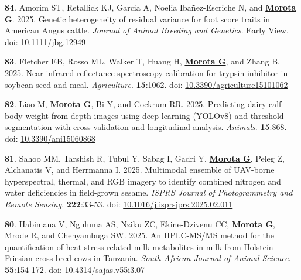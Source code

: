 \documentclass[margin,line,10pt]{res}
\newenvironment{list1}{
  \begin{list}{\ding{113}}{%
      \setlength{\itemsep}{0in}
      \setlength{\parsep}{0in} \setlength{\parskip}{0in}
      \setlength{\topsep}{0in} \setlength{\partopsep}{0in} 
      \setlength{\leftmargin}{0.17in}}}{\end{list}}
\begin{document}
\begin{resume}
\begin{list1}
  \item [{\bf 84}.] Amorim ST, Retallick KJ, Garcia A, Noelia Iba\~{n}ez-Escriche N, and \textbf{\underline{Morota G}}. 2025. Genetic heterogeneity of residual variance for foot score traits in American Angus cattle. \emph{Journal of Animal Breeding and Genetics}. Early View. doi: \textcolor{blue}{\href{https://doi.org/10.1111/jbg.12949}{10.1111/jbg.12949}}

  \vspace{0.5cm}

  \item [{\bf 83}.] Fletcher EB, Rosso ML, Walker T, Huang H, \textbf{\underline{Morota G}}, and Zhang B. 2025. Near-infrared reflectance spectroscopy calibration for trypsin inhibitor in soybean seed and meal. \emph{Agriculture}. \textbf{15}:1062. doi: \textcolor{blue}{\href{https://doi.org/10.3390/agriculture15101062}{10.3390/agriculture15101062}}

  \vspace{0.5cm}


  \item [{\bf 82}.] Liao M, \textbf{\underline{Morota G}}, Bi Y, and Cockrum RR. 2025. Predicting dairy calf body weight from depth images using deep learning (YOLOv8) and threshold segmentation with cross-validation and longitudinal analysis. \emph{Animals}. \textbf{15}:868. doi: \textcolor{blue}{\href{https://doi.org/10.3390/ani15060868}{10.3390/ani15060868}}

  \vspace{0.5cm}

  \item  [{\bf 81}.] Sahoo MM, Tarshish R, Tubul Y, Sabag I, Gadri Y, \textbf{\underline{Morota G}}, Peleg Z, Alchanatis V, and Herrmanna I. 2025. Multimodal ensemble of UAV-borne hyperspectral, thermal, and RGB imagery to identify combined nitrogen and water deficiencies in field-grown sesame. \emph{ISPRS Journal of Photogrammetry and Remote Sensing}. \textbf{222}:33-53. doi: \textcolor{blue}{\href{https://doi.org/10.1016/j.isprsjprs.2025.02.011}{10.1016/j.isprsjprs.2025.02.011}}

  \vspace{0.5cm}

  \item  [{\bf 80}.] Habimana V, Nguluma AS, Nziku ZC, Ekine-Dzivenu CC, \textbf{\underline{Morota G}}, Mrode R, and Chenyambuga SW. 2025. An HPLC-MS/MS method for the quantification of heat stress-related milk metabolites in milk from Holstein-Friesian cross-bred cows in Tanzania. \emph{South African Journal of Animal Science}.  \textbf{55}:154-172. doi: \textcolor{blue}{\href{https://dx.doi.org/10.4314/sajas.v55i3.07}{10.4314/sajas.v55i3.07}}


\end{list1}
\end{resume}
\end{document}
